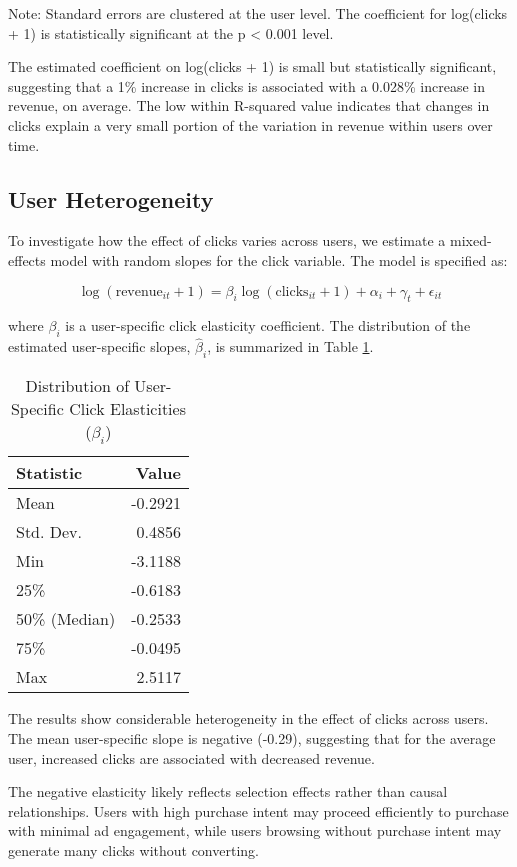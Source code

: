 Note: Standard errors are clustered at the user level. The coefficient for log(clicks + 1) is statistically significant at the p < 0.001 level.

The estimated coefficient on log(clicks + 1) is small but statistically significant, suggesting that a 1\% increase in clicks is associated with a 0.028\% increase in revenue, on average. The low within R-squared value indicates that changes in clicks explain a very small portion of the variation in revenue within users over time.

\subsection*{User Heterogeneity}

To investigate how the effect of clicks varies across users, we estimate a mixed-effects model with random slopes for the click variable. The model is specified as:

\begin{equation}
\log(\text{revenue}_{it} + 1) = \beta_i \log(\text{clicks}_{it} + 1) + \alpha_i + \gamma_t + \epsilon_{it}
\end{equation}

where $\beta_i$ is a user-specific click elasticity coefficient. The distribution of the estimated user-specific slopes, $\hat{\beta}_i$, is summarized in Table \ref{tab:user_me_results}.

\begin{table}[htbp!]
\centering
\caption{Distribution of User-Specific Click Elasticities ($\beta_i$)}
\label{tab:user_me_results}
\begin{tabular}{lr}
\toprule
Statistic & Value \\
\midrule
Mean & -0.2921 \\
Std. Dev. & 0.4856 \\
Min & -3.1188 \\
25\% & -0.6183 \\
50\% (Median) & -0.2533 \\
75\% & -0.0495 \\
Max & 2.5117 \\
\bottomrule
\end{tabular}
\end{table}

The results show considerable heterogeneity in the effect of clicks across users. The mean user-specific slope is negative (-0.29), suggesting that for the average user, increased clicks are associated with decreased revenue.

The negative elasticity likely reflects selection effects rather than causal relationships. Users with high purchase intent may proceed efficiently to purchase with minimal ad engagement, while users browsing without purchase intent may generate many clicks without converting.
